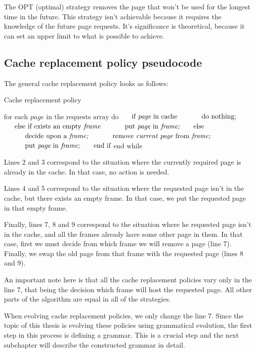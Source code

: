 The OPT (optimal) strategy removes the page that won't be used for the longest time in the future. This strategy isn't achievable because it requires the knowledge of the future page requests. It's significance is theoretical, because it can set an upper limit to what is possible to achieve.

\subsection{Cache replacement policy pseudocode}
The general cache replacement policy looks as follows:

\begin{algorithm}[]
\caption{Cache replacement policy}
\begin{algorithmic}[1]
\State $\text{for each } \textit{page} \text{ in the requests array do}$
\State $\indent \text{if } \textit{page} \text{ in cache} $
\State $\indent \indent \text{do nothing;} $
\State $\indent \text{else if exists an empty } \textit{frame} $
\State $\indent \indent \text{put } \textit{page} \text{ in } \textit{frame;} $
\State $\indent \text{else} $
\State $\indent \indent \text{decide upon a } \textit{frame;}$
\State $\indent \indent \text{remove } \textit{current page} 
\text{ from } \textit{frame;}$
\State $\indent \indent \text{put } \textit{page} \text{ in } \textit{frame;} $
\State $\indent \text{end if}$
\State $\text{end while}$
\end{algorithmic}
\end{algorithm}

Lines 2 and 3 correspond to the situation where the currently required page is already in the cache. In that case, no action is needed.

Lines 4 and 5 correspond to the situation where the requested page isn't in the cache, but there exists an empty frame. In that case, we put the requested page in that empty frame.

Finally, lines 7, 8 and 9 correspond to the situation where he requested page isn't in the cache, and all the frames already have some other page in them. In that case, first we must decide from which frame we will remove a page (line 7). Finally, we swap the old page from that frame with the requested page (lines 8 and 9).

An important note here is that all the cache replacement policies vary only in the line 7, that being the decision which frame will host the requested page. All other parts of the algorithm are equal in all of the strategies. 

When evolving cache replacement policies, we only change the line 7. Since the topic of this thesis is evolving these policies using grammatical evolution, the first step in this process is defining a grammar. This is a crucial step and the next subchapter will describe the constructed grammar in detail.